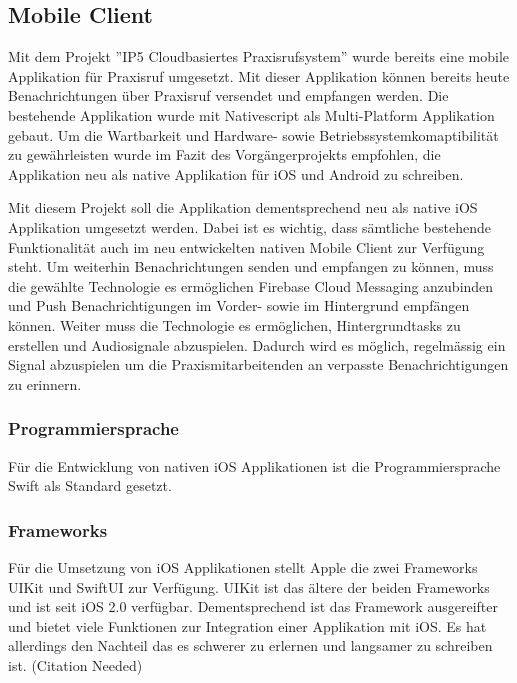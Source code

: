 
\subsection{Mobile Client}

Mit dem Projekt ''IP5 Cloudbasiertes Praxisrufsystem''\cite{ip5} wurde bereits eine mobile Applikation für Praxisruf umgesetzt.
Mit dieser Applikation können bereits heute Benachrichtungen über Praxisruf versendet und empfangen werden.
Die bestehende Applikation wurde mit Nativescript als Multi-Platform Applikation gebaut.
Um die Wartbarkeit und Hardware- sowie Betriebssystemkomaptibilität zu gewährleisten wurde im Fazit des Vorgängerprojekts empfohlen,
die Applikation neu als native Applikation für iOS und Android zu schreiben.\cite{ip5}

Mit diesem Projekt soll die Applikation dementsprechend neu als native iOS Applikation umgesetzt werden.
Dabei ist es wichtig, dass sämtliche bestehende Funktionalität auch im neu entwickelten nativen Mobile Client zur Verfügung steht.
Um weiterhin Benachrichtungen senden und empfangen zu können, muss die gewählte Technologie es ermöglichen Firebase Cloud Messaging anzubinden
und Push Benachrichtigungen im Vorder- sowie im Hintergrund empfängen können.
Weiter muss die Technologie es ermöglichen, Hintergrundtasks zu erstellen und Audiosignale abzuspielen.
Dadurch wird es möglich, regelmässig ein Signal abzuspielen um die Praxismitarbeitenden an verpasste Benachrichtigungen zu erinnern.

\subsubsection*{Programmiersprache}

Für die Entwicklung von nativen iOS Applikationen ist die Programmiersprache Swift als Standard gesetzt.\cite{ios_swift}


\subsubsection*{Frameworks}

Für die Umsetzung von iOS Applikationen stellt Apple die zwei Frameworks UIKit\cite{ios_uikit} und SwiftUI\cite{ios_swift_ui} zur Verfügung.
UIKit ist das ältere der beiden Frameworks und ist seit iOS 2.0 verfügbar.
Dementsprechend ist das Framework ausgereifter und bietet viele Funktionen zur Integration einer Applikation mit iOS.
Es hat allerdings den Nachteil das es schwerer zu erlernen und langsamer zu schreiben ist. (Citation Needed)

